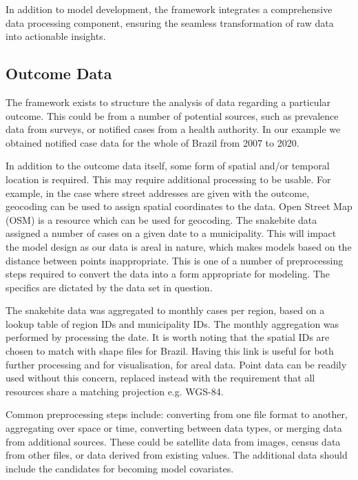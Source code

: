 \documentclass{article}
\begin{document}
In addition to model development, the framework integrates a comprehensive data processing component, ensuring the seamless transformation of raw data into actionable insights. 



\subsection{Outcome Data}
The framework exists to structure the analysis of data regarding a particular outcome. This could be from a number of potential sources, such as prevalence data from surveys, or notified cases from a health authority. In our example we obtained notified case data for the whole of Brazil from 2007 to 2020.

In addition to the outcome data itself, some form of spatial and/or temporal location is required. This may require additional processing to be usable. For example, in the case where street addresses are given with the outcome, geocoding can be used to assign spatial coordinates to the data. Open Street Map (OSM) \cite{osm} is a resource which can be used for geocoding.
The snakebite data assigned a number of cases on a given date to a municipality. This will impact the model design as our data is areal in nature, which makes models based on the distance between points inappropriate. This is one of a number of preprocessing steps required to convert the data into a form appropriate for modeling. The specifics are dictated by the data set in question.

The snakebite data was aggregated to monthly cases per region, based on a lookup table of region IDs and municipality IDs. The monthly aggregation was performed by processing the date. It is worth noting that the spatial IDs are chosen to match with shape files for Brazil. Having this link is useful for both further processing and for visualisation, for areal data. Point data can be readily used without this concern, replaced instead with the requirement that all resources share a matching projection e.g. WGS-84.

Common preprocessing steps include: converting from one file format to another, aggregating over space or time, converting between data types, or merging data from additional sources. These could be satellite data from images, census data from other files, or data derived from existing values. The additional data should include the candidates for becoming model covariates.
\end{document}
